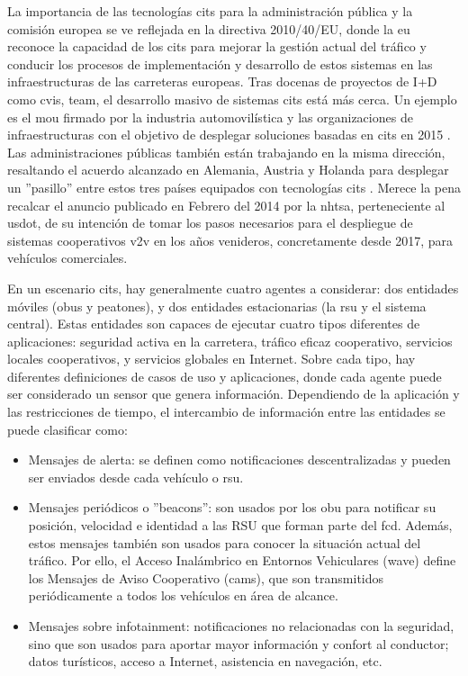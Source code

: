 La importancia de las tecnologías \gls{cits} para la administración pública y la comisión europea se ve reflejada en la directiva 2010/40/EU, donde la \gls{eu} reconoce la capacidad de los \gls{cits} para mejorar la gestión actual del tráfico y conducir los procesos de implementación y desarrollo de estos sistemas en las infraestructuras de las carreteras europeas. Tras docenas de proyectos de I+D como \gls{cvis}, \gls{team}, el desarrollo masivo de sistemas \gls{cits} está más cerca. Un ejemplo es el \gls{mou} firmado por la industria automovilística y las organizaciones de infraestructuras con el objetivo de desplegar soluciones basadas en \gls{cits} en 2015 \cite{3}. Las administraciones públicas también están trabajando en la misma dirección, resaltando el acuerdo alcanzado en Alemania, Austria y Holanda para desplegar un ''pasillo'' entre estos tres países equipados con tecnologías \gls{cits} \cite{4}. Merece la pena recalcar el anuncio publicado en Febrero del 2014 por la \gls{nhtsa}, perteneciente al \gls{usdot}, de su intención de tomar los pasos necesarios para el despliegue de sistemas cooperativos \gls{v2v} en los años venideros, concretamente desde 2017, para vehículos comerciales.

En un escenario \gls{cits}, hay generalmente cuatro agentes a considerar: dos entidades móviles (\gls{obu}s y peatones), y dos entidades estacionarias (la \gls{rsu} y el sistema central). Estas entidades son capaces de ejecutar cuatro tipos diferentes de aplicaciones: seguridad activa en la carretera, tráfico eficaz cooperativo, servicios locales cooperativos, y servicios globales en Internet. Sobre cada tipo, hay diferentes definiciones de casos de uso y aplicaciones, donde cada agente puede ser considerado un sensor que genera información. Dependiendo de la aplicación y las restricciones de  tiempo, el intercambio de información entre las entidades se puede clasificar como:

\begin{itemize}
	\item Mensajes de alerta: se definen como notificaciones descentralizadas y pueden ser enviados desde cada vehículo o \gls{rsu}.

	\item Mensajes periódicos o ''beacons'': son usados por los \gls{obu} para notificar su posición, velocidad e identidad a las RSU que forman parte del \gls{fcd}. Además, estos mensajes también son usados para conocer la situación	actual del tráfico. Por ello, el Acceso Inalámbrico en Entornos Vehiculares (\gls{wave})	define los Mensajes de Aviso Cooperativo (\gls{cam}s), que son transmitidos periódicamente	a todos los vehículos en área de alcance.

	\item Mensajes sobre infotainment: notificaciones no relacionadas con la seguridad, sino que son usados para aportar mayor información y confort al conductor; datos turísticos, acceso a Internet, asistencia en navegación, etc.
\end{itemize}

